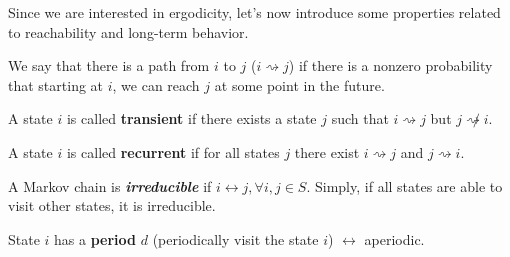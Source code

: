 Since we are interested in ergodicity, let's now introduce some properties related to reachability and long-term behavior.

\begin{definition}
We say that there is a path from $i$ to $j$ ($i\rightsquigarrow j$) if there is a nonzero probability that starting at $i$, we can reach $j$ at some point in the future. 
\end{definition}

\begin{definition}
	A state $i$ is called \textbf{transient} if there exists a state $j$ such that $i\rightsquigarrow j$ but $j\not\rightsquigarrow i$.
\end{definition}

\begin{definition}
	A state $i$ is called \textbf{recurrent} if for all states $j$ there exist $i\rightsquigarrow j$ and $j\rightsquigarrow i$.
\end{definition}

\begin{definition}
A Markov chain is \textbf{\textit{irreducible}} if $i\leftrightarrow j, \forall i,j\in S$. Simply, if all states are able to visit other states, it is irreducible. 
\end{definition}

\begin{definition}
	State $i$ has a \textbf{period} $d$ (\ie periodically visit the state $i$) $\leftrightarrow$ aperiodic.
\end{definition}

